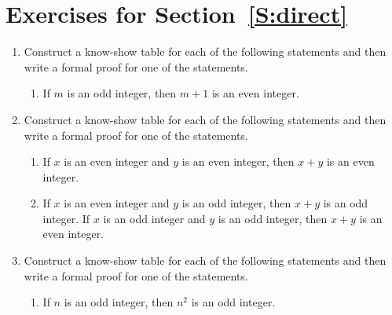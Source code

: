 \section*{Exercises for Section~\ref{S:direct}}
\begin{enumerate}

\item Construct a know-show table for each of the following statements and then write a formal proof for one of the statements. 
\label{exer:evenodd}%
  \begin{enumerate}
    \yitem If  $m$  is an even integer, then  $m + 1$  is an odd integer.
    \item If  $m$  is an odd integer, then  $m + 1$ is an even integer.
  \end{enumerate}
  \label{exer:nextint}%


\item \label{exer:evenoddadd}%
Construct a know-show table for each of the following statements and then write a formal proof for one of the statements.  

  \begin{enumerate}
    \item If  $x$  is an even integer and  $y$  is an even integer, then  $x + y$ is an even integer.
    \item If  $x$  is an even integer and  $y$  is an odd integer, then  $x + y$ is an odd integer.
    \yitem If  $x$  is an odd integer and  $y$  is an odd integer, then  $x + y$ is an even integer.
  \end{enumerate}
  \label{exer:integeradd}%


\item \label{exer:evenoddmult}%
Construct a know-show table for each of the following statements and then write a formal proof for one of the statements.  

  \begin{enumerate}
    \yitem If  $m$  is an even integer and  $n$  is an integer, then  $m \cdot n$ is an even integer.
    \yitem If  $n$  is an even integer, then  $n^2$ is an even integer.
    \item \label{exer:x2odd}%
       If  $n$  is an odd integer, then  $n^2$ is an odd integer. 
  \end{enumerate}
  \label{exer:integermult}%


\end{enumerate}
